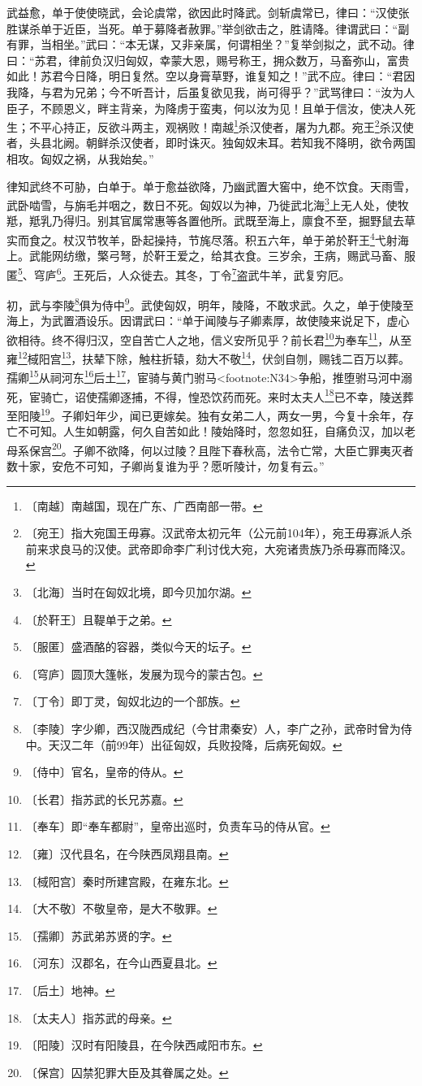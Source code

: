 \documentclass[12pt,UTF-8,openany,a4]{ctexbook}
\begin{document}
\begin{large}
    武益愈，单于使使晓武，会论虞常，欲因此时降武。剑斩虞常已，律曰：“汉使张胜谋杀单于近臣，当死。单于募降者赦罪。”举剑欲击之，胜请降。律谓武曰：“副有罪，当相坐。”武曰：“本无谋，又非亲属，何谓相坐？”复举剑拟之，武不动。律曰：“苏君，律前负汉归匈奴，幸蒙大恩，赐号称王，拥众数万，马畜弥山，富贵如此！苏君今日降，明日复然。空以身膏草野，谁复知之！”武不应。律曰：“君因我降，与君为兄弟；今不听吾计，后虽复欲见我，尚可得乎？”武骂律曰：“汝为人臣子，不顾恩义，畔主背亲，为降虏于蛮夷，何以汝为见！且单于信汝，使决人死生；不平心持正，反欲斗两主，观祸败！南越\footnote{〔南越〕\yiwen 南越国，现在广东、广西南部一带。}杀汉使者，屠为九郡。宛王\footnote{〔宛王〕\yiwen 指大宛国王毋寡。汉武帝太初元年（公元前104年），宛王毋寡派人杀前来求良马的汉使。武帝即命李广利讨伐大宛，大宛诸贵族乃杀毋寡而降汉。}杀汉使者，头县北阙。朝鲜杀汉使者，即时诛灭。独匈奴未耳。若知我不降明，欲令两国相攻。匈奴之祸，从我始矣。”
    
    律知武终不可胁，白单于。单于愈益欲降，乃幽武置大窖中，绝不饮食。天雨雪，武卧啮雪，与旃毛并咽之，数日不死。匈奴以为神，乃徙武北海\footnote{〔北海〕\yiwen 当时在匈奴北境，即今贝加尔湖。}上无人处，使牧羝，羝乳乃得归。别其官属常惠等各置他所。武既至海上，廪食不至，掘野鼠去草实而食之。杖汉节牧羊，卧起操持，节旄尽落。积五六年，单于弟於靬王\footnote{〔於靬王〕\yiwen 且鞮单于之弟。}弋射海上。武能网纺缴，檠弓弩，於靬王爱之，给其衣食。三岁余，王病，赐武马畜、服匿\footnote{〔服匿〕\yiwen 盛酒酪的容器，类似今天的坛子。}、穹庐\footnote{〔穹庐〕\yiwen 圆顶大篷帐，发展为现今的蒙古包。}。王死后，人众徙去。其冬，丁令\footnote{〔丁令〕\yiwen 即丁灵，匈奴北边的一个部族。}盗武牛羊，武复穷厄。
    
    初，武与李陵\footnote{〔李陵〕\yiwen 字少卿，西汉陇西成纪（今甘肃秦安）人，李广之孙，武帝时曾为侍中。天汉二年（前99年）出征匈奴，兵败投降，后病死匈奴。}俱为侍中\footnote{〔侍中〕\yiwen 官名，皇帝的侍从。}。武使匈奴，明年，陵降，不敢求武。久之，单于使陵至海上，为武置酒设乐。因谓武曰：“单于闻陵与子卿素厚，故使陵来说足下，虚心欲相待。终不得归汉，空自苦亡人之地，信义安所见乎？前长君\footnote{〔长君〕\yiwen 指苏武的长兄苏嘉。}为奉车\footnote{〔奉车〕\yiwen 即“奉车都尉”，皇帝出巡时，负责车马的侍从官。}，从至雍\footnote{〔雍〕\yiwen 汉代县名，在今陕西凤翔县南。}棫阳宫\footnote{〔棫阳宫〕\yiwen 秦时所建宫殿，在雍东北。}，扶辇下除，触柱折辕，劾大不敬\footnote{〔大不敬〕\yiwen 不敬皇帝，是大不敬罪。}，伏剑自刎，赐钱二百万以葬。孺卿\footnote{〔孺卿〕\yiwen 苏武弟苏贤的字。}从祠河东\footnote{〔河东〕\yiwen 汉郡名，在今山西夏县北。}后土\footnote{〔后土〕\yiwen 地神。}，宦骑与黄门驸马<footnote:N34>争船，推堕驸马河中溺死，宦骑亡，诏使孺卿逐捕，不得，惶恐饮药而死。来时太夫人\footnote{〔太夫人〕\yiwen 指苏武的母亲。}已不幸，陵送葬至阳陵\footnote{〔阳陵〕\yiwen 汉时有阳陵县，在今陕西咸阳市东。}。子卿妇年少，闻已更嫁矣。独有女弟二人，两女一男，今复十余年，存亡不可知。人生如朝露，何久自苦如此！陵始降时，忽忽如狂，自痛负汉，加以老母系保宫\footnote{〔保宫〕\yiwen 囚禁犯罪大臣及其眷属之处。}。子卿不欲降，何以过陵？且陛下春秋高，法令亡常，大臣亡罪夷灭者数十家，安危不可知，子卿尚复谁为乎？愿听陵计，勿复有云。”
    

\end{large}
\end{document}
